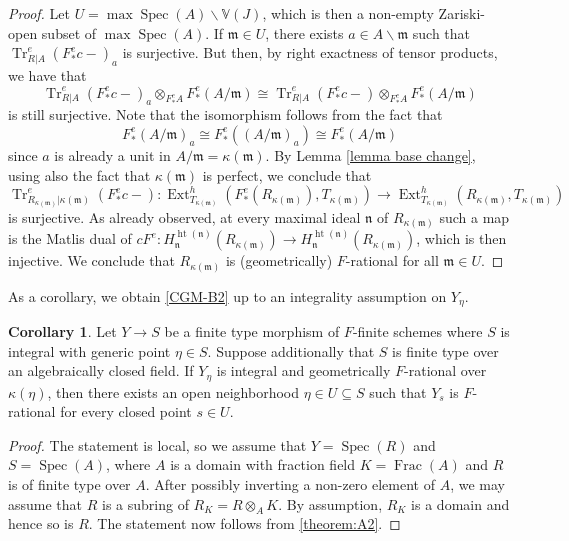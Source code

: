 \documentclass[reqno,11pt]{amsart}
\numberwithin{equation}{section}
\theoremstyle{definition}
\theoremstyle{definition}
\newtheorem{corollary}[theorem]{Corollary}
\theoremstyle{definition}
\theoremstyle{remark}
\newcommand{\Spec}{\operatorname{Spec}}
\newcommand{\Height}{\operatorname{ht}}
\newcommand{\Ext}{\operatorname{Ext}}
\newcommand{\Tr}{\operatorname{Tr}}
\newcommand{\Frac}{\operatorname{Frac}}
\newcommand{\fm}{\mathfrak{m}}
\newcommand{\fn}{\mathfrak{n}}
\begin{document}
\begin{proof}
    Let $U = \max\Spec(A) \smallsetminus \mathbb{V}(J)$, which is then a non-empty Zariski-open subset of $\max\Spec(A)$. If $\fm \in U$, there exists $a \in A \smallsetminus \fm$ such that $\Tr^e_{R|A}(F^e_*c -)_a$ is surjective. But then, by right exactness of tensor products, we have that 
    \[
    \Tr^e_{R|A}(F^e_*c-)_a \otimes_{F^e_*A} F^e_*(A/\fm) \cong \Tr^e_{R|A}(F^e_*c-) \otimes_{F^e_*A} F^e_*(A/\fm)
    \]
    is still surjective. Note that the isomorphism follows from the fact that $$F^e_*(A/\fm)_a \cong F^e_*((A/\fm)_a) \cong F^e_*(A/\fm)$$ since $a$ is already a unit in $A/\fm = \kappa(\fm)$. By Lemma \ref{lemma base change}, using also the fact that $\kappa(\fm)$ is perfect, we conclude that
    \[
    \Tr^e_{R_{\kappa(\fm)}|\kappa(\fm)}(F^e_*c -)\colon  \Ext^h_{T_{\kappa(\fm)}}(F^e_*(R_{\kappa(\fm)}),T_{\kappa(\fm)}) \to \Ext^h_{T_{\kappa(\fm)}}(R_{\kappa(\fm)},T_{\kappa(\fm)})
    \]
    is surjective. As already observed, at every maximal ideal $\fn$ of $R_{\kappa(\fm)}$ such a map is the Matlis dual of $c F^e\colon  H^{\Height(\fn)}_{\fn}(R_{\kappa(\fm)}) \to H^{\Height(\fn)}_{\fn}(R_{\kappa(\fm)})$, which is then injective. 
    We conclude that $R_{\kappa(\fm)}$ is (geometrically) $F$-rational for all $\fm \in U$.
\end{proof}






As a corollary, we obtain \ref{CGM-B2} up to an integrality assumption on $Y_\eta$.

\begin{corollary}\label{cor:A2-F-rational}
    Let $Y\to S$ be a finite type morphism of $F$-finite schemes where $S$ is integral with generic point $\eta\in S$. Suppose additionally that $S$ is finite type over an algebraically closed field. If $Y_\eta$ is integral and geometrically $F$-rational over $\kappa(\eta)$, then there exists an open neighborhood $\eta\in U\subseteq S$ such that $Y_s$ is $F$-rational for every closed point $s\in U$.
\end{corollary}
\begin{proof}
    The statement is local, so we assume that $Y = \Spec(R)$ and $S=\Spec(A)$, where $A$ is a domain with fraction field $K=\Frac(A)$ and $R$ is of finite type over $A$. After possibly inverting a non-zero element of $A$, we may assume that $R$ is a subring of $R_K = R \otimes_A K$. By assumption, $R_K$ is a domain and hence so is $R$. The statement now follows from \cref{theorem:A2}.
\end{proof}
\end{document}
